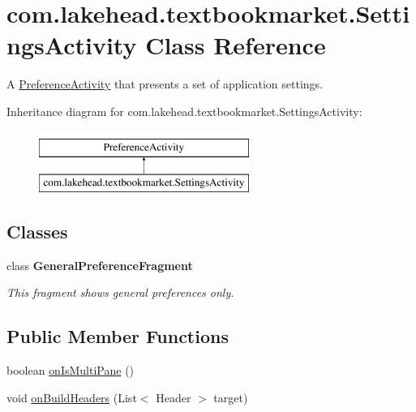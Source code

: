 \hypertarget{classcom_1_1lakehead_1_1textbookmarket_1_1_settings_activity}{\section{com.\-lakehead.\-textbookmarket.\-Settings\-Activity Class Reference}
\label{classcom_1_1lakehead_1_1textbookmarket_1_1_settings_activity}
}


A \hyperlink{}{Preference\-Activity} that presents a set of application settings.  


Inheritance diagram for com.\-lakehead.\-textbookmarket.\-Settings\-Activity\-:\begin{figure}[H]
\begin{center}
\leavevmode
\includegraphics[height=2.000000cm]{classcom_1_1lakehead_1_1textbookmarket_1_1_settings_activity}
\end{center}
\end{figure}
\subsection*{Classes}
\begin{DoxyCompactItemize}
\item 
class {\bfseries General\-Preference\-Fragment}
\begin{DoxyCompactList}\small\item\em This fragment shows general preferences only. \end{DoxyCompactList}\end{DoxyCompactItemize}
\subsection*{Public Member Functions}
\begin{DoxyCompactItemize}
\item 
\hypertarget{classcom_1_1lakehead_1_1textbookmarket_1_1_settings_activity_a874897036b4cd5bfbbd18a7902634260}{boolean \hyperlink{classcom_1_1lakehead_1_1textbookmarket_1_1_settings_activity_a874897036b4cd5bfbbd18a7902634260}{on\-Is\-Multi\-Pane} ()}\label{classcom_1_1lakehead_1_1textbookmarket_1_1_settings_activity_a874897036b4cd5bfbbd18a7902634260}

\item 
\hypertarget{classcom_1_1lakehead_1_1textbookmarket_1_1_settings_activity_add6f835473c4feff603b5989e48e1f18}{void \hyperlink{classcom_1_1lakehead_1_1textbookmarket_1_1_settings_activity_add6f835473c4feff603b5989e48e1f18}{on\-Build\-Headers} (List$<$ Header $>$ target)}\label{classcom_1_1lakehead_1_1textbookmarket_1_1_settings_activity_add6f835473c4feff603b5989e48e1f18}

\end{DoxyCompactItemize}
